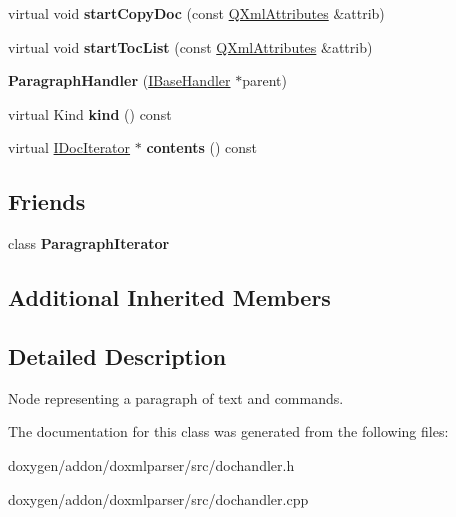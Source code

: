 \begin{DoxyCompactItemize}
virtual void {\bfseries start\+Copy\+Doc} (const \mbox{\hyperlink{class_q_xml_attributes}{Q\+Xml\+Attributes}} \&attrib)
\item 
\mbox{\label{class_paragraph_handler_ae531bc17befad4534ff0ceb15111b72a}} 
virtual void {\bfseries start\+Toc\+List} (const \mbox{\hyperlink{class_q_xml_attributes}{Q\+Xml\+Attributes}} \&attrib)
\item 
\mbox{\label{class_paragraph_handler_a9233054818146db22bbd3f6653693575}} 
{\bfseries Paragraph\+Handler} (\mbox{\hyperlink{class_i_base_handler}{I\+Base\+Handler}} $\ast$parent)
\item 
\mbox{\label{class_paragraph_handler_a28266754c2ae9883c2afb61f8b23e488}} 
virtual Kind {\bfseries kind} () const
\item 
\mbox{\label{class_paragraph_handler_a7966233f9396eb39226b936bf4c7eaec}} 
virtual \mbox{\hyperlink{class_i_doc_iterator}{I\+Doc\+Iterator}} $\ast$ {\bfseries contents} () const
\end{DoxyCompactItemize}
\subsection*{Friends}
\begin{DoxyCompactItemize}
\item 
\mbox{\label{class_paragraph_handler_a7fa8f6c15543966442bacc223e8c0721}} 
class {\bfseries Paragraph\+Iterator}
\end{DoxyCompactItemize}
\subsection*{Additional Inherited Members}


\subsection{Detailed Description}
Node representing a paragraph of text and commands. 



The documentation for this class was generated from the following files\+:\begin{DoxyCompactItemize}
\item 
doxygen/addon/doxmlparser/src/dochandler.\+h\item 
doxygen/addon/doxmlparser/src/dochandler.\+cpp\end{DoxyCompactItemize}
